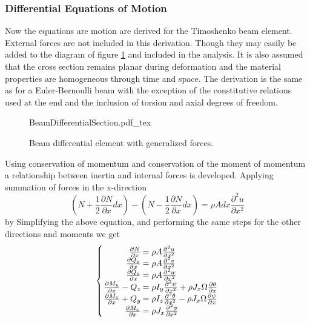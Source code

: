 \subsubsection{Differential Equations of Motion} \label{Differential Equations of Motion}
Now the equations are motion are derived for the Timoshenko beam element. External forces are not included in this derivation. Though they may easily be added to the diagram of figure \ref{fig:BeamDifferentialSection} and included in the analysis. It is also assumed that the cross section remains planar during deformation and the material properties are homogeneous through time and space. The derivation is the same as for a Euler-Bernoulli beam with the exception of the constitutive relations used at the end and the inclusion of torsion and axial degrees of freedom.
\begin{figure}
	\centering
	\def\svgwidth{600pt}
	{BeamDifferentialSection.pdf_tex}
	\caption{Beam differential element with generalized forces.}
	\label{fig:BeamDifferentialSection}
\end{figure}
Using conservation of momentum and conservation of the moment of momentum a relationship between inertia and internal forces is developed. Applying summation of forces in the x-direction
\begin{equation}\label{key}
(N+\frac{1}{2}\frac{\partial N}{\partial x}dx)-(N-\frac{1}{2}\frac{\partial N}{\partial x}dx)=\rho A dx \frac{\partial^2u}{\partial x^2}
\end{equation}
by Simplifying the above equation, and performing the same steps for the other directions and moments we get
\begin{equation}\label{eq:EquilibriumEquations}
\left\{\arraycolsep=1pt\begin{array}{rl}
\frac{\partial N}{\partial x}&=\rho A\frac{\partial^2 u}{\partial x^2}\\
\frac{\partial Q_y}{\partial x}&=\rho A\frac{\partial^2 v}{\partial x^2}\\
\frac{\partial Q_z}{\partial x}&=\rho A\frac{\partial^2 w}{\partial x^2}\\
\frac{\partial M_y}{\partial x}-Q_z&=\rho I_y \frac{\partial^2\psi}{\partial x^2} + \rho J_x\Omega\frac{\partial\theta}{\partial x}\\
\frac{\partial M_z}{\partial x}+Q_y&=\rho I_z \frac{\partial^2\theta}{\partial x^2} - \rho J_x\Omega\frac{\partial\psi}{\partial x}\\
\frac{\partial M_x}{\partial x}&=\rho J_x\frac{\partial^2\phi}{\partial x^2}
\end{array}\right.
\end{equation}
